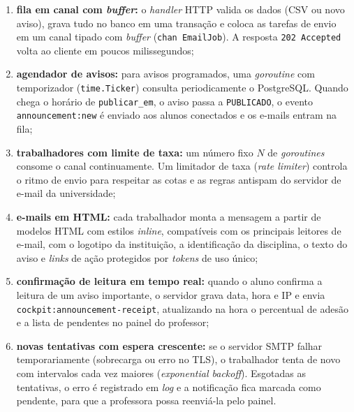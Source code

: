 \begin{enumerate}
    \item \textbf{fila em canal com \textit{buffer}:} o \textit{handler} HTTP valida os dados (CSV ou novo aviso), grava tudo no banco em uma transação e coloca as tarefas de envio em um canal tipado com \textit{buffer} (\texttt{chan EmailJob}). A resposta \texttt{202 Accepted} volta ao cliente em poucos milissegundos;
    \item \textbf{agendador de avisos:} para avisos programados, uma \textit{goroutine} com temporizador (\texttt{time.Ticker}) consulta periodicamente o PostgreSQL. Quando chega o horário de \texttt{publicar\_em}, o aviso passa a \texttt{PUBLICADO}, o evento \texttt{announcement:new} é enviado aos alunos conectados e os e-mails entram na fila;
    \item \textbf{trabalhadores com limite de taxa:} um número fixo $N$ de \textit{goroutines} consome o canal continuamente. Um limitador de taxa (\textit{rate limiter}) controla o ritmo de envio para respeitar as cotas e as regras antispam do servidor de e-mail da universidade;
    \item \textbf{e-mails em HTML:} cada trabalhador monta a mensagem a partir de modelos HTML com estilos \textit{inline}, compatíveis com os principais leitores de e-mail, com o logotipo da instituição, a identificação da disciplina, o texto do aviso e \textit{links} de ação protegidos por \textit{tokens} de uso único;
    \item \textbf{confirmação de leitura em tempo real:} quando o aluno confirma a leitura de um aviso importante, o servidor grava data, hora e IP e envia \texttt{cockpit:announcement-receipt}, atualizando na hora o percentual de adesão e a lista de pendentes no painel do professor;
    \item \textbf{novas tentativas com espera crescente:} se o servidor SMTP falhar temporariamente (sobrecarga ou erro no TLS), o trabalhador tenta de novo com intervalos cada vez maiores (\textit{exponential backoff}). Esgotadas as tentativas, o erro é registrado em \textit{log} e a notificação fica marcada como pendente, para que a professora possa reenviá-la pelo painel.
\end{enumerate}
